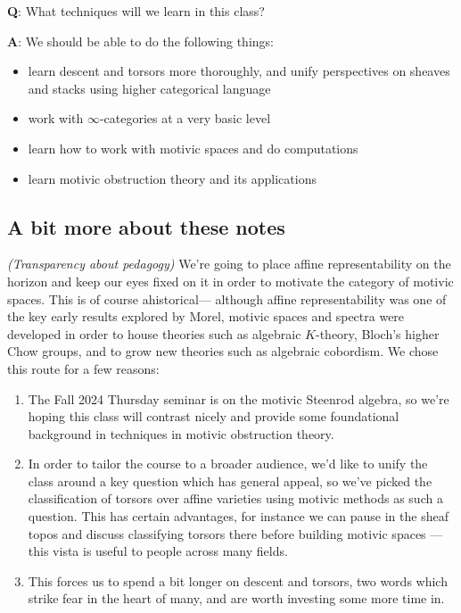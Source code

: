 \documentclass[11pt]{amsart}
\begin{document}
\textbf{Q}: What techniques will we learn in this class?

\textbf{A}: We should be able to do the following things:
\begin{itemize}
    \item learn descent and torsors more thoroughly, and unify perspectives on sheaves and stacks using higher categorical language
    \item work with $\infty$-categories at a very basic level
    \item learn how to work with motivic spaces and do computations
    \item learn motivic obstruction theory and its applications
\end{itemize}

\subsection{A bit more about these notes}

\begin{remark} \textit{(Transparency about pedagogy)} We're going to place affine representability on the horizon and keep our eyes fixed on it in order to motivate the category of motivic spaces. This is of course ahistorical--- although affine representability was one of the key early results explored by Morel, motivic spaces and spectra were developed in order to house theories such as algebraic $K$-theory, Bloch's higher Chow groups, and to grow new theories such as algebraic cobordism. We chose this route for a few reasons:
\begin{enumerate}
    \item The Fall 2024 Thursday seminar is on the motivic Steenrod algebra, so we're hoping this class will contrast nicely and provide some foundational background in techniques in motivic obstruction theory.
    \item In order to tailor the course to a broader audience, we'd like to unify the class around a key question which has general appeal, so we've picked the classification of torsors over affine varieties using motivic methods as such a question. This has certain advantages, for instance we can pause in the sheaf topos and discuss classifying torsors there before building motivic spaces --- this vista is useful to people across many fields.

    \item This forces us to spend a bit longer on descent and torsors, two words which strike fear in the heart of many, and are worth investing some more time in.
\end{enumerate}
\end{remark}
\end{document}
